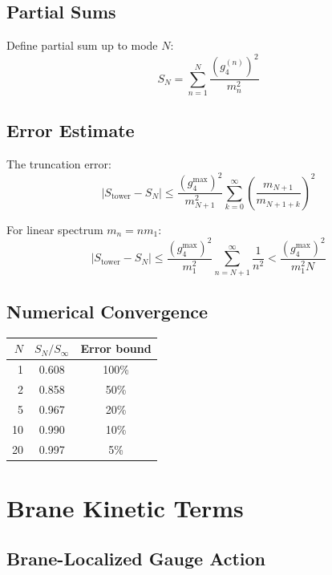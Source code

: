 \documentclass[11pt,a4paper]{article}
\begin{document}
\subsection{Partial Sums}

Define partial sum up to mode $N$:
\begin{equation}
S_N = \sum_{n=1}^{N} \frac{(g_4^{(n)})^2}{m_n^2}
\label{eq:partial-sum}
\end{equation}

\subsection{Error Estimate}

The truncation error:
\begin{equation}
|S_{\text{tower}} - S_N| \leq \frac{(g_4^{\max})^2}{m_{N+1}^2} \sum_{k=0}^{\infty} \left(\frac{m_{N+1}}{m_{N+1+k}}\right)^2
\label{eq:truncation-detailed}
\end{equation}

For linear spectrum $m_n = n m_1$:
\begin{equation}
|S_{\text{tower}} - S_N| \leq \frac{(g_4^{\max})^2}{m_1^2} \sum_{n=N+1}^{\infty} \frac{1}{n^2}
< \frac{(g_4^{\max})^2}{m_1^2 N}
\label{eq:error-linear}
\end{equation}

\subsection{Numerical Convergence}

\begin{center}
\begin{tabular}{rcc}
\toprule
$N$ & $S_N/S_{\infty}$ & Error bound \\
\midrule
1 & 0.608 & 100\% \\
2 & 0.858 & 50\% \\
5 & 0.967 & 20\% \\
10 & 0.990 & 10\% \\
20 & 0.997 & 5\% \\
\bottomrule
\end{tabular}
\end{center}

\section{Brane Kinetic Terms}
\label{app:brane}

\subsection{Brane-Localized Gauge Action}
\end{document}
